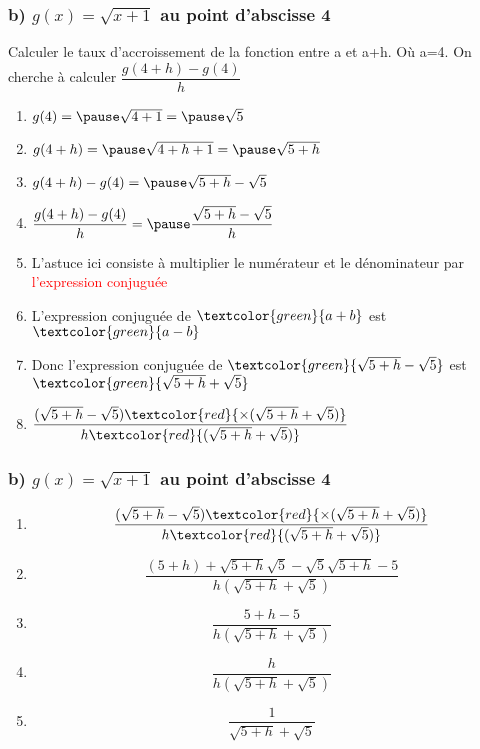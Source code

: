 \documentclass[t]{beamer}
\begin{document}
	\begin{frame}
		\frametitle{b) $g(x) = \sqrt{x+1}$ au point d'abscisse 4}
		\pause
		Calculer le taux d'accroissement de la fonction entre a et a+h. \pause Où a=4.
		\pause
		On cherche à calculer \( \dfrac{g(4+h) - g(4)}{h} \)
		\pause
		\begin{enumerate}[]
			\item \(g(4) = \pause \sqrt{4+1} = \pause \sqrt{5} \)
			\pause
			\item \(g(4+h) = \pause \sqrt{4+h+1} = \pause \sqrt{5+h} \)
			\pause
			\item \(g(4+h) - g(4) = \pause \sqrt{5+h} - \sqrt{5} \)
			\pause
			\item \( \dfrac{g(4+h) - g(4)}{h} = \pause \dfrac{\sqrt{5+h} - \sqrt{5}}{h} \)
			\pause
			\item L'astuce ici consiste à multiplier le numérateur et le dénominateur par \textcolor{red}{l'expression conjuguée}
			\pause
			\item L'expression conjuguée de $\textcolor{green}{a+b}$ est \pause $\textcolor{green}{a-b}$
			\pause
			\item Donc l'expression conjuguée de $\textcolor{green}{\sqrt{5+h} - \sqrt{5}}$ \pause est $\textcolor{green}{\sqrt{5+h} + \sqrt{5}}$
			\pause
			\item \(\dfrac{(\sqrt{5+h} - \sqrt{5}) \textcolor{red}{\times (\sqrt{5+h} + \sqrt{5})}}{h \textcolor{red}{(\sqrt{5+h} + \sqrt{5})}}\)
		\end{enumerate}
	\end{frame}

	\begin{frame}[label=pagebanale]
		\frametitle{b) $g(x) = \sqrt{x+1}$ au point d'abscisse 4}
		\pause
		\begin{enumerate}[]
			\item<+-> \[\dfrac{(\sqrt{5+h} - \sqrt{5}) \textcolor{red}{\times (\sqrt{5+h} + \sqrt{5})}}{h \textcolor{red}{(\sqrt{5+h} + \sqrt{5})}}\]
			\item<+-> \[\dfrac{(5+h) + \sqrt{5+h}\sqrt{5} - \sqrt{5}\sqrt{5+h} - 5}{h (\sqrt{5+h} + \sqrt{5})} \]
			\item<+-> \[\dfrac{5+h - 5}{h (\sqrt{5+h} + \sqrt{5})} \]
			\item<+-> \[\dfrac{h}{h (\sqrt{5+h} + \sqrt{5})} \]
			\item<+-> \[\dfrac{1}{\sqrt{5+h} + \sqrt{5}} \]
		\end{enumerate}
	\end{frame}
\end{document}

